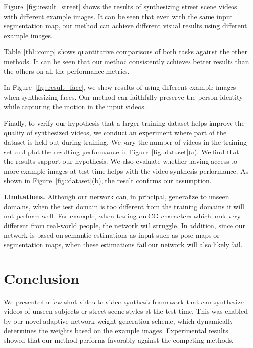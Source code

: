 \documentclass{article}
\begin{document}
Figure~\ref{fig::result_street} shows the results of synthesizing street scene videos with different example images. It can be seen that even with the same input segmentation map, our method can achieve different visual results using different example images. 

Table~\ref{tbl::comp} shows quantitative comparisons of both tasks against the other methods. It can be seen that our method consistently achieves better results than the others on all the performance metrics.

In Figure~\ref{fig::result_face}, we show results of using different example images when synthesizing faces. Our method can faithfully preserve the person identity while capturing the motion in the input videos. 

Finally, to verify our hypothesis that a larger training dataset helps improve the quality of synthesized videos, we conduct an experiment where part of the dataset is held out during training. We vary the number of videos in the training set and plot the resulting performance in Figure~\ref{fig::dataset}(a). We find that the results support our hypothesis. We also evaluate whether having access to more example images at test time helps with the video synthesis performance. As shown in Figure~\ref{fig::dataset}(b), the result confirms our assumption.



{\bf Limitations.} Although our network can, in principal, generalize to unseen domains, when the test domain is too different from the training domains it will not perform well. For example, when testing on CG characters which look very different from real-world people, the network will struggle. In addition, since our network is based on semantic estimations as input such as pose maps or segmentation maps, when these estimations fail our network will also likely fail. \section{Conclusion}\label{sec::conc}

We presented a few-shot video-to-video synthesis framework that can synthesize videos of unseen subjects or street scene styles at the test time. This was enabled by our novel adaptive network weight generation scheme, which dynamically determines the weights based on the example images. Experimental results showed that our method performs favorably against the competing methods. 
\clearpage


{\small
	
	
}
\end{document}
